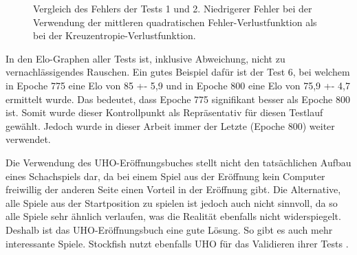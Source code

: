 \begin{figure}
  \centering
  \caption{Vergleich des Fehlers der Tests 1 und 2. Niedrigerer Fehler bei der Verwendung der mittleren quadratischen Fehler-Verlustfunktion als bei der Kreuzentropie-Verlustfunktion.}
  \label{fig:loss1_2}
\end{figure}

In den Elo-Graphen aller Tests ist, inklusive Abweichung, nicht zu vernachlässigendes Rauschen. Ein gutes Beispiel dafür ist der Test 6, bei welchem in Epoche 775 eine Elo von 85 +- 5,9 und in Epoche 800 eine Elo von 75,9 +- 4,7 ermittelt wurde. Das bedeutet, dass Epoche 775 signifikant besser als Epoche 800 ist. Somit wurde dieser Kontrollpunkt als Repräsentativ für diesen Testlauf gewählt. Jedoch wurde in dieser Arbeit immer der Letzte (Epoche 800) weiter verwendet.



Die Verwendung des \ac{UHO}-Eröffnungsbuches stellt nicht den tatsächlichen Aufbau eines Schachspiels dar, da bei einem Spiel aus der Eröffnung kein Computer freiwillig der anderen Seite einen Vorteil in der Eröffnung gibt. Die Alternative, alle Spiele aus der Startposition zu spielen ist jedoch auch nicht sinnvoll, da so alle Spiele sehr ähnlich verlaufen, was die Realität ebenfalls nicht widerspiegelt. Deshalb ist das \ac{UHO}-Eröffnungsbuch eine gute Lösung. So gibt es auch mehr interessante Spiele. Stockfish nutzt ebenfalls \ac{UHO} für das Validieren ihrer Tests \cite{Fishtest}. 

